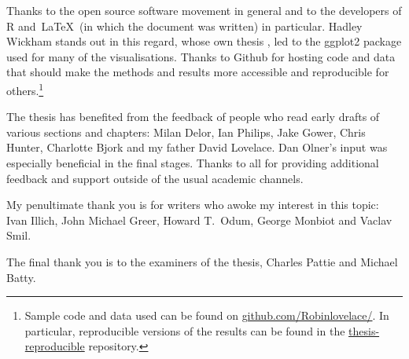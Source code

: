 \documentclass[a4paper, 11pt, twoside]{Thesis}
\begin{document}
{Thanks to the open source software movement in general and to the developers
of R and~\LaTeX~(in which the document was written) in particular.
Hadley Wickham stands out in this
regard, whose own thesis \citep{Wickham2008}, led to the ggplot2 package
used for many of the visualisations.
Thanks to Github for hosting code and data that should make the methods
and results more accessible and reproducible for
others.\footnote{Sample code
and data used can be found on {\color{blue} \href{https://github.com/Robinlovelace/}
{github.com/Robinlovelace/}}. In particular, reproducible versions of
the results can be found in the {\color{blue} \href{https://github.com/Robinlovelace/thesis-reproducible}
{thesis-reproducible}} repository. }

The thesis has benefited from the feedback of people who read 
early drafts of various sections and chapters: Milan Delor,
Ian Philips, Jake Gower, Chris Hunter, Charlotte Bjork and my father 
David Lovelace. Dan Olner's input was especially beneficial in the final 
stages. Thanks to all for providing additional feedback and support outside
of the usual academic channels.

My penultimate thank you is for writers who awoke my interest in this topic: Ivan
Illich, John Michael Greer, Howard T.~Odum, George Monbiot and
Vaclav Smil.

The final thank you is to the examiners of the thesis, Charles Pattie and
Michael Batty. 
}
\clearpage  

\pagestyle{fancy}  
\setcounter{tocdepth}{1} 
\setcounter{tocdepth}{2} 
{}
\fancyfoot{}
\tableofcontents  


\fancyfoot{}

\listoffigures  

\fancyfoot{}
\listoftables  

\clearpage  
{}
\fancyfoot{}
\end{document}

